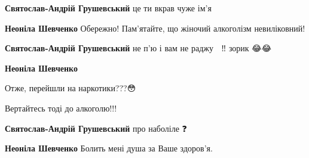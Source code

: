 \begin{itemize}
\begin{itemize}
\textbf{Святослав-Андрій Грушевський} це ти вкрав чуже ім'я

 
\textbf{Неоніла Шевченко} Обережно! Пам'ятайте, що жіночий алкоголізм невиліковний!

 
\textbf{Святослав-Андрій Грушевський} не п'ю і вам не раджу 🤣 ‼️ зорик 😂😂

 
\textbf{Неоніла Шевченко} 

Отже, перейшли на наркотики???😳

Вертайтесь тоді до алкоголю!!!

 
\textbf{Святослав-Андрій Грушевський} про наболіле ❓ 🤣 🤣

 
\textbf{Неоніла Шевченко} Болить мені душа за Ваше здоров'я.

\end{itemize}

 

\end{itemize}
